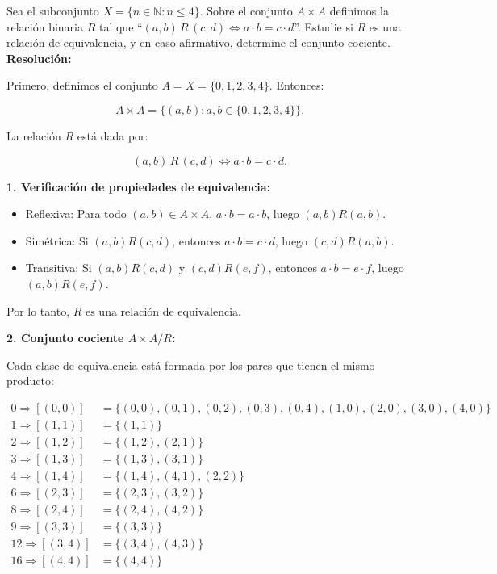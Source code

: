 \documentclass[a4paper,12pt]{article}
\begin{document}
\begin{ejercicio}[title=Ejercicio 11]
Sea el subconjunto $X = \{n\in\mathbb{N} : n \le 4\}$. Sobre el conjunto $A\times A$ definimos la relación binaria
$R$ tal que ``$(a,b)\,R\,(c,d) \iff a\cdot b = c\cdot d$''. Estudie si $R$ es una relación de equivalencia, y en
caso afirmativo, determine el conjunto cociente.
\tcblower
\textbf{Resolución:}

Primero, definimos el conjunto $A = X = \{0,1,2,3,4\}$. Entonces:

\[
A\times A = \{ (a,b) : a,b \in \{0,1,2,3,4\} \}.
\]

La relación $R$ está dada por:

\[
(a,b) \, R \, (c,d) \iff a\cdot b = c \cdot d.
\]

\textbf{1. Verificación de propiedades de equivalencia:}

\begin{itemize}
\item Reflexiva: Para todo $(a,b) \in A\times A$, $a\cdot b = a\cdot b$, luego $(a,b) R (a,b)$.  
\item Simétrica: Si $(a,b)R(c,d)$, entonces $a\cdot b = c \cdot d$, luego $(c,d) R (a,b)$.  
\item Transitiva: Si $(a,b)R(c,d)$ y $(c,d)R(e,f)$, entonces $a\cdot b = e\cdot f$, luego $(a,b)R(e,f)$.  
\end{itemize}

Por lo tanto, \(\boxed{\text{$R$ es una relación de equivalencia.}}\)

\vspace{0.5em}

\textbf{2. Conjunto cociente $A\times A / R$:}  

Cada clase de equivalencia está formada por los pares que tienen el mismo producto:

\[
\begin{aligned}
0 \Rightarrow [(0,0)] &= \{(0,0),(0,1),(0,2),(0,3),(0,4),(1,0),(2,0),(3,0),(4,0)\} \\
1\Rightarrow [(1,1)] &= \{(1,1)\} \\
2\Rightarrow [(1,2)] &= \{(1,2),(2,1)\} \\
3\Rightarrow [(1,3)] &= \{(1,3),(3,1)\} \\
4\Rightarrow [(1,4)] &= \{(1,4),(4,1),(2,2)\} \\
6\Rightarrow [(2,3)] &= \{(2,3),(3,2)\} \\
8\Rightarrow [(2,4)] &= \{(2,4),(4,2)\} \\
9\Rightarrow [(3,3)] &= \{(3,3)\} \\
12\Rightarrow [(3,4)] &= \{(3,4),(4,3)\} \\
16\Rightarrow [(4,4)] &= \{(4,4)\} \\
\end{aligned}
\]


\end{ejercicio}
\end{document}
